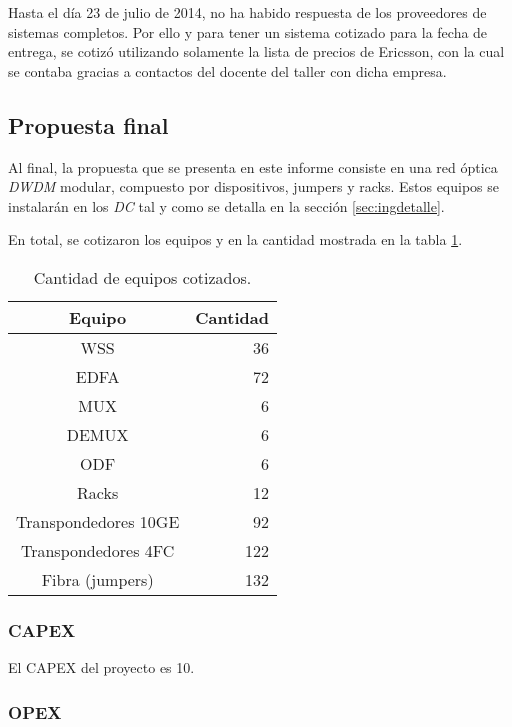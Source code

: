 
Hasta el día 23 de julio de 2014, no ha habido respuesta de los
proveedores de sistemas completos. Por ello y para tener un sistema
cotizado para la fecha de entrega, se cotizó utilizando solamente la
lista de precios de Ericsson, con la cual se contaba gracias a
contactos del docente del taller con dicha empresa.

\subsection{Propuesta final}
\label{sec:ppfinal}

Al final, la propuesta que se presenta en este informe consiste en una
red óptica \emph{DWDM} modular, compuesto por dispositivos, jumpers y
racks. Estos equipos se instalarán en los \emph{DC} tal y como se
detalla en la sección \ref{sec:ingdetalle}.

En total, se cotizaron los equipos y en la cantidad mostrada en la
tabla \ref{tab:propfinal}.

\begin{table}[H]
  \centering
  \begin{tabular}{| c | r |}
    \hline
    Equipo & Cantidad \\
    \hline
    WSS & 36 \\
    EDFA & 72 \\
    MUX & 6 \\
    DEMUX & 6 \\
    ODF & 6 \\
    Racks & 12 \\
    Transpondedores 10GE & 92 \\
    Transpondedores 4FC & 122 \\
    Fibra (jumpers) & 132 \\
    \hline
  \end{tabular}
  \caption{Cantidad de equipos cotizados.}
  \label{tab:propfinal}
\end{table}

\subsubsection{CAPEX}
\label{sec:capex}

El CAPEX del proyecto es 10.

\subsubsection{OPEX}
\label{sec:opex}

